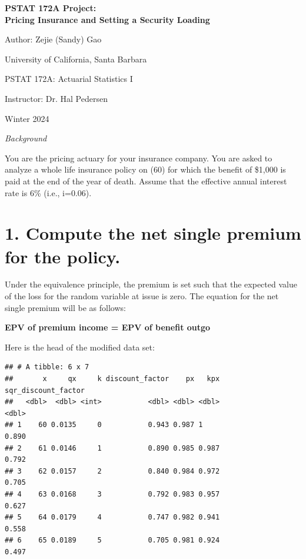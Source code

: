 \documentclass[
]{article}
\author{}
\date{\vspace{-2.5em}}
\begin{document}
\begin{titlepage}
\centering
\vspace*{5cm}
{\Large\bfseries PSTAT 172A Project:\\[0.5em]
Pricing Insurance and Setting a Security Loading\par}
\vspace{2cm}
{\large Author: Zejie (Sandy) Gao\par}
{\large University of California, Santa Barbara\par}
{\large PSTAT 172A: Actuarial Statistics I\par}
{\large Instructor: Dr. Hal Pedersen\par}
{\large Winter 2024\par}
\vspace*{\fill}
\end{titlepage}

\newpage

\emph{Background}

You are the pricing actuary for your insurance company. You are asked to
analyze a whole life insurance policy on (60) for which the benefit of
\$1,000 is paid at the end of the year of death. Assume that the
effective annual interest rate is 6\% (i.e., i=0.06).

\hypertarget{compute-the-net-single-premium-for-the-policy.}{%
\section{1. Compute the net single premium for the
policy.}\label{compute-the-net-single-premium-for-the-policy.}}

Under the equivalence principle, the premium is set such that the
expected value of the loss for the random variable at issue is zero. The
equation for the net single premium will be as follows:

\begin{center}
  \textbf{EPV of premium income = EPV of benefit outgo}
\end{center}

Here is the head of the modified data set:

\begin{verbatim}
## # A tibble: 6 x 7
##       x     qx     k discount_factor    px   kpx sqr_discount_factor
##   <dbl>  <dbl> <int>           <dbl> <dbl> <dbl>               <dbl>
## 1    60 0.0135     0           0.943 0.987 1                   0.890
## 2    61 0.0146     1           0.890 0.985 0.987               0.792
## 3    62 0.0157     2           0.840 0.984 0.972               0.705
## 4    63 0.0168     3           0.792 0.983 0.957               0.627
## 5    64 0.0179     4           0.747 0.982 0.941               0.558
## 6    65 0.0189     5           0.705 0.981 0.924               0.497
\end{verbatim}
\end{document}
